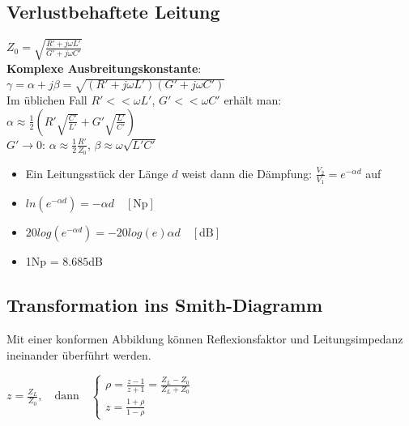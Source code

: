 \documentclass[english]{latex4ei/latex4ei_sheet}
\begin{document}
\begin{sectionbox}
	\subsection{Verlustbehaftete Leitung}
	$Z_0 = \sqrt{\frac{R' +j\omega L'}{G' + j\omega C'}}$\\
	\textbf{Komplexe Ausbreitungskonstante}:\\
	
	$\gamma = \alpha + j\beta = \sqrt{(R' + j\omega L')(G'+j\omega C')}$\\
	Im üblichen Fall $R' << \omega L'$, $G' << \omega C'$ erhält man:\\
	
	$\alpha \approx \frac{1}{2}\left(R'\sqrt{\frac{C'}{L'}} + G'\sqrt{\frac{L'}{C'}} \right)$\\
	$G' \to 0$: $\alpha \approx \frac{1}{2} \frac{R'}{Z_0}$, $\beta \approx \omega\sqrt{L'C'}$\\
	
	\begin{itemize}
		\item Ein Leitungsstück der Länge $d$ weist dann die Dämpfung: $\frac{V_2}{V_1}=e^{-\alpha d}$ auf
		\item $ln(e^{-\alpha d}) = -\alpha d \quad[\text{Np}]$
		\item $20log(e^{-\alpha d}) = -20log(e)\alpha d \quad [\text{dB}]$
		\item 1Np = $8.685$dB
	\end{itemize}
\end{sectionbox}
\begin{sectionbox}
	\subsection{Transformation ins Smith-Diagramm}
	Mit einer konformen Abbildung können Reflexionsfaktor und Leitungsimpedanz ineinander überführt werden.\\
	\begin{emphbox}
		$z=\frac{Z_L}{Z_0}, \quad \text{dann} \quad \begin{cases}
			\rho = \frac{z-1}{z+1} = \frac{Z_L-Z_0}{Z_L+Z_0}\\
			z = \frac{1+\rho}{1-\rho}
		\end{cases}$
	\end{emphbox}
	
\end{sectionbox}
\end{document}
